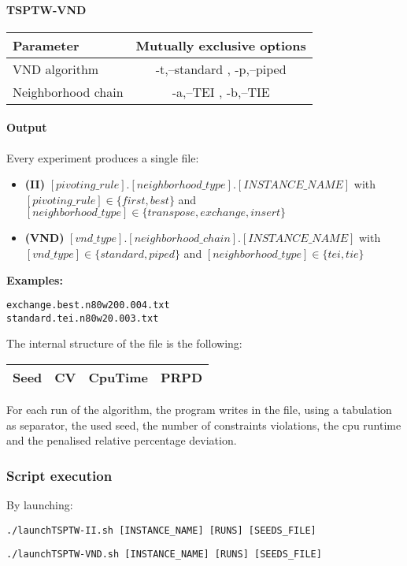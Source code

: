 \documentclass{article}
\begin{document}
\paragraph{TSPTW-VND}

\begin{tabular}{|l|c|}
\hline
\textbf{Parameter}	&	\textbf{Mutually exclusive options} \\ \hline
VND algorithm & -t,--standard , -p,--piped \\ \hline
Neighborhood chain & 	-a,--TEI  , -b,--TIE \\ \hline
\end{tabular}

\paragraph{Output}
Every experiment produces a single file:
\begin{itemize}
  \item \textbf{(II)} $[pivoting\_rule].[neighborhood\_type].[INSTANCE\_NAME]$ with $[pivoting\_rule] \in \{first,best\}$ and $[neighborhood\_type] \in \{transpose,exchange,insert\}$ 
  \item \textbf{(VND)} $[vnd\_type].[neighborhood\_chain].[INSTANCE\_NAME]$ with $[vnd\_type] \in \{standard,piped\}$ and $[neighborhood\_type] \in \{tei,tie\}$
\end{itemize} 
				
					 
\textbf{Examples:} \begin{verbatim}
exchange.best.n80w200.004.txt
standard.tei.n80w20.003.txt
\end{verbatim}


The internal structure of the file is the following: \begin{tabular}{|c|c|c|c|}
\hline
\textbf{Seed}	&	\textbf{CV} & \textbf{CpuTime} & \textbf{PRPD} \\ \hline
\end{tabular}

For each run of the algorithm, the program writes in the file, using a tabulation as separator,
the used seed, the number of constraints violations, the cpu runtime and the penalised relative percentage deviation.


\subsubsection{Script execution}
By launching:
\begin{center}
\begin{verbatim}
./launchTSPTW-II.sh [INSTANCE_NAME] [RUNS] [SEEDS_FILE]
\end{verbatim}
\begin{verbatim}
./launchTSPTW-VND.sh [INSTANCE_NAME] [RUNS] [SEEDS_FILE]
\end{verbatim}
\end{center}
\end{document}
